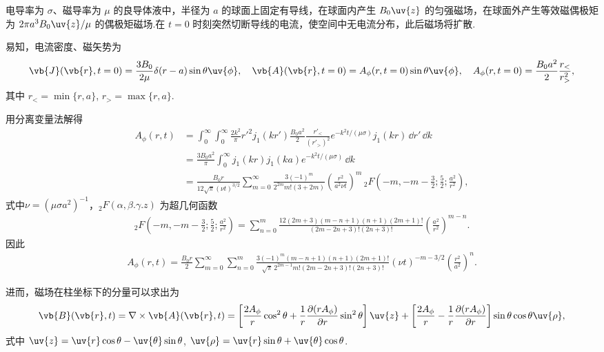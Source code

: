 \begin{exbox}
	电导率为 \(\sigma\)、磁导率为 \(\mu\) 的良导体液中，半径为 \(a\) 的球面上固定有导线，在球面内产生 \(B_0 \uv{z}\) 的匀强磁场，在球面外产生等效磁偶极矩为 \(2\pi a^3 B_0 \uv{z}/\mu\) 的偶极矩磁场.在 \(t=0\) 时刻突然切断导线的电流，使空间中无电流分布，此后磁场将扩散.

	易知，电流密度、磁矢势为
	\begin{align*}
		\vb{J}(\vb{r}, t=0) = \frac{3B_0}{2\mu} \delta(r-a) \sin\theta \uv{\phi},\quad
		\vb{A}(\vb{r}, t=0)= A_\phi(r,t=0) \sin\theta \uv{\phi},\quad
		A_\phi(r,t=0) = \frac{B_0 a^2}{2} \frac{r_<}{r_>^2},
	\end{align*}
	其中 \(r_< = \min\{r,a\}\), \(r_> = \max\{r,a\}\).

	用分离变量法解得
	\begin{align*}
		A_\phi(r,t) & = \int_0^\infty \int_0^\infty \frac{2k^2}{\pi} r'^2 j_1(kr') \frac{B_0 a^2}{2} \frac{r'_<}{(r'_>)^2} e^{-k^2 t/(\mu\sigma)} j_1(kr) \,\dd r' \,\dd k                                             \\
		            & = \frac{3B_0 a^2}{\pi} \int_0^\infty j_1(kr) j_1(ka) e^{-k^2 t/(\mu\sigma)} \,\dd k                                                                                                             \\
		            & = \frac{B_0 r}{12\sqrt{\pi} (\nu t)^{3/2}} \sum_{m=0}^\infty \frac{3(-1)^m}{2^{2m} m! (3+2m)} \left(\frac{r^2}{a^2 \nu t}\right)^m \,_2F\left(-m, -m-\frac32; \frac52; \frac{a^2}{r^2}\right),
	\end{align*}
	式中\(\nu = (\mu\sigma a^2)^{-1}\)，\(_2F(\alpha,\beta.\gamma.z)\) 为超几何函数
	\begin{align*}
		_2F\!\left(-m, -m-\frac32; \frac52; \frac{a^2}{r^2}\right) = \sum_{n=0}^m \frac{12(2m+3)(m-n+1)(n+1)(2m+1)!}{(2m-2n+3)! (2n+3)!} \left(\frac{a^2}{r^2}\right)^{m-n}.
	\end{align*}
	因此
	\begin{align*}
		A_\phi(r,t) = \frac{B_0 r}{2} \sum_{m=0}^\infty \sum_{n=0}^m \frac{3(-1)^m (m-n+1)(n+1)(2m+1)!}{\sqrt{\pi}\,2^{2m-1} m! (2m-2n+3)! (2n+3)!} (\nu t)^{-m-3/2} \left(\frac{r^2}{a^2}\right)^n.
	\end{align*}

	进而，磁场在柱坐标下的分量可以求出为
	\begin{align*}
		\vb{B}(\vb{r},t) = \nabla \times \vb{A}(\vb{r},t)
		= \left[\frac{2A_\phi}{r} \cos^2\theta + \frac{1}{r} \frac{\partial(rA_\phi)}{\partial r} \sin^2\theta\right] \uv{z}
		+ \left[\frac{2A_\phi}{r} - \frac{1}{r} \frac{\partial(rA_\phi)}{\partial r}\right] \sin\theta \cos\theta \uv{\rho},
	\end{align*}
	式中 \(\uv{z} = \uv{r}\cos\theta - \uv{\theta}\sin\theta\), \(\uv{\rho} = \uv{r}\sin\theta + \uv{\theta}\cos\theta\).


\end{exbox}
